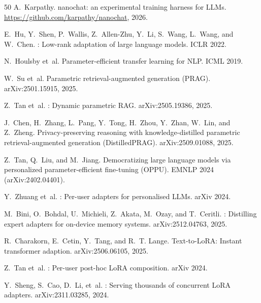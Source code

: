 \documentclass[11pt]{article}
\begin{document}
\begin{thebibliography}{50}
A.~Karpathy.
\newblock nanochat: an experimental training harness for LLMs.
\newblock \url{https://github.com/karpathy/nanochat}, 2026.

E.~Hu, Y.~Shen, P.~Wallis, Z.~Allen-Zhu, Y.~Li, S.~Wang, L.~Wang, and W.~Chen.
: Low-rank adaptation of large language models.
\newblock ICLR 2022.

N.~Houlsby et~al.
\newblock Parameter-efficient transfer learning for {NLP}.
\newblock ICML 2019.

W.~Su et~al.
\newblock Parametric retrieval-augmented generation ({PRAG}).
\newblock arXiv:2501.15915, 2025.

Z.~Tan et~al.
: Dynamic parametric {RAG}.
\newblock arXiv:2505.19386, 2025.

J.~Chen, H.~Zhang, L.~Pang, Y.~Tong, H.~Zhou, Y.~Zhan, W.~Lin, and Z.~Zheng.
\newblock Privacy-preserving reasoning with knowledge-distilled parametric
  retrieval-augmented generation ({DistilledPRAG}).
\newblock arXiv:2509.01088, 2025.

Z.~Tan, Q.~Liu, and M.~Jiang.
\newblock Democratizing large language models via personalized
  parameter-efficient fine-tuning ({OPPU}).
\newblock EMNLP 2024 (arXiv:2402.04401).

Y.~Zhuang et~al.
: Per-user adapters for personalised {LLMs}.
\newblock arXiv 2024.

M.~Bini, O.~Bohdal, U.~Michieli, Z.~Akata, M.~Ozay, and T.~Ceritli.
: Distilling expert adapters for on-device memory systems.
\newblock arXiv:2512.04763, 2025.

R.~Charakorn, E.~Cetin, Y.~Tang, and R.~T. Lange.
\newblock Text-to-{LoRA}: Instant transformer adaption.
\newblock arXiv:2506.06105, 2025.

Z.~Tan et~al.
: Per-user post-hoc {LoRA} composition.
\newblock arXiv 2024.

Y.~Sheng, S.~Cao, D.~Li, et~al.
: Serving thousands of concurrent {LoRA} adapters.
\newblock arXiv:2311.03285, 2024.


\end{thebibliography}
\end{document}
